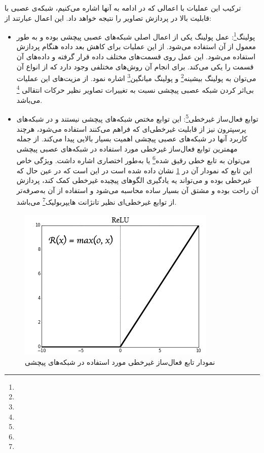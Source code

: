 ترکیب این عملیات با اعمالی که در ادامه به آنها اشاره می‌کنیم،  شبکه‌ی عصبی با قابلیت بالا در پردازش تصاویر را نتیجه خواهد داد. این اعمال عبارتند از:
\begin{itemize}
	\item پولینگ\footnote{}:
	عمل پولینگ یکی از اعمال اصلی شبکه‌های عصبی پیچشی بوده و به طور معمول  از آن استفاده می‌شود. از این عملیات برای کاهش بعد داده هنگام پردازش استفاده می‌شود. این عمل روی قسمت‌های مختلف داده قرار گرفته و داده‌های آن قسمت را یکی می‌کند. برای انجام آن روش‌های مختلفی وجود دارد که از انواع آن می‌توان به پولینگ بیشینه\footnote{} و پولینگ میانگین\footnote{} اشاره نمود. از مزیت‌های این عملیات بی‌اثر کردن شبکه عصبی پیچشی نسبت به تغییرات تصاویر نظیر حرکات انتقالی \footnote{}  می‌باشد.
	
	\item توابع فعال‌ساز غیر‌خطی\footnote{}:
	 این توابع مختص شبکه‌های پیچشی نیستند و در شبکه‌های پرسپترون نیز از قابلیت غیر‌خطی‌ای که فراهم ‌می‌کنند استفاده می‌شود، هرچند کاربرد آنها در شبکه‌های عصبی پیچشی اهمیت بسیار بالایی پیدا می‌کند. از جمله مهمترین توابع فعال‌ساز غیر‌خطی مورد استفاده در شبکه‌های عصبی پیچشی می‌توان به تابع خطی رقیق شده\footnote{} یا به‌طور اختصاری  اشاره داشت. ویژگی خاص این تابع که نمودار آن در \ref{fig:relu} نشان داده شده است در این است که در عین حال که غیرخطی بوده و می‌تواند یه یادگیری الگوهای پیچیده غیرخطی کمک کند، پردازش آن راحت بوده و مشتق آن بسیار ساده محاسبه می‌شود و استفاده از آن به‌صرفه‌تر از توابع غیرخطی‌ای نظیر تانژانت هایپربولیک\footnote{} می‌باشد.
\end{itemize}

\begin{figure}[t!]
	\centering
	\includegraphics[scale=0.55]{figures/relu.png}
	\caption[نمودار تابع فعال‌ساز غیرخطی  مورد استفاده در شبکه‌های پیچشی]{نمودار تابع فعال‌ساز غیر‌خطی  مورد استفاده در شبکه‌های پیچشی‌}
	\label{fig:relu}
\end{figure}

